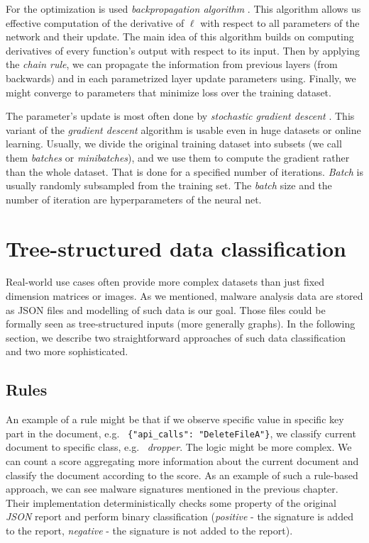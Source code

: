 For the optimization is used \emph{backpropagation algorithm} \cite{Rumelhart1988}. This algorithm allows us effective computation of the derivative of $\ell$ with respect to all parameters of the network and their update. The main idea of this algorithm builds on computing derivatives of every function's output with respect to its input. Then by applying the \emph{chain rule}, we can propagate the information from previous layers (from backwards) and in each parametrized layer update parameters using. Finally, we might converge to parameters that minimize loss over the training dataset. 

The parameter's update is most often done by \emph{stochastic gradient descent} \cite{Kiefer1952}. This variant of the \emph{gradient descent} algorithm is usable even in huge datasets or online learning. Usually, we divide the original training dataset into subsets (we call them \emph{batches} or \emph{minibatches}), and we use them to compute the gradient rather than the whole dataset. That is done for a specified number of iterations. \emph{Batch} is usually randomly subsampled from the training set. The \emph{batch} size and the number of iteration are hyperparameters of the neural net.

\section{Tree-structured data classification}
Real-world use cases often provide more complex datasets than just fixed dimension matrices or images. As we mentioned, malware analysis data are stored as JSON files and modelling of such data is our goal. Those files could be formally seen as tree-structured inputs (more generally graphs). In the following section, we describe two straightforward approaches of such data classification and two more sophisticated.

\subsection{Rules}
An example of a rule might be that if we observe specific value in specific key part in the document, e.g. \ \lstinline|{"api_calls": "DeleteFileA"}|, we classify current document to specific class, e.g. \ \emph{dropper}. The logic might be more complex. We can count a score aggregating more information about the current document and classify the document according to the score. As an example of such a rule-based approach, we can see malware signatures mentioned in the previous chapter. Their implementation deterministically checks some property of the original \emph{JSON} report and perform binary classification (\emph{positive} - the signature is added to the report, \emph{negative} - the signature is not added to the report).

